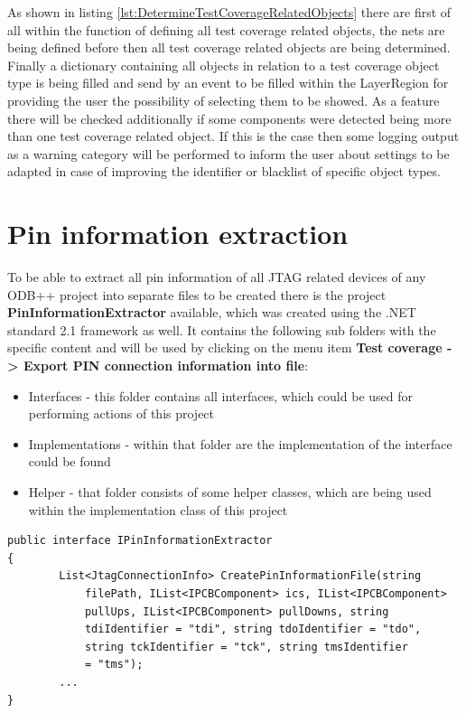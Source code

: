 As shown in listing \ref{lst:DetermineTestCoverageRelatedObjects} there are first of all within the function of defining all test coverage related objects, the nets are being defined before then all test coverage related objects are being determined. Finally a dictionary containing all objects in relation to a test coverage object type is being filled and send by an event to be filled within the LayerRegion for providing the user the possibility of selecting them to be showed. As a feature there will be checked additionally if some components were detected being more than one test coverage related object. If this is the case then some logging output as a warning category will be performed to inform the user about settings to be adapted in case of improving the identifier or blacklist of specific object types.

	\section{Pin information extraction}
To be able to extract all pin information of all \ac{JTAG} related devices of any \ac{ODB}++ project into separate files to be created there is the project \textbf{PinInformationExtractor} available, which was created using the .NET standard 2.1 framework as well. It contains the following sub folders with the specific content and will be used by clicking on the menu item \textbf{Test coverage -> Export PIN connection information into file}:
\begin{itemize}
	\item Interfaces - this folder contains all interfaces, which could be used for performing actions of this project
	\item Implementations - within that folder are the implementation of the interface could be found
	\item Helper - that folder consists of some helper classes, which are being used within the implementation class of this project
\end{itemize}

\begin{lstlisting}[language={[Sharp]C},caption={IPinInformationExtractor},captionpos=b,label=lst:IPinInformationExtractor]
public interface IPinInformationExtractor
{
		List<JtagConnectionInfo> CreatePinInformationFile(string 
			filePath, IList<IPCBComponent> ics, IList<IPCBComponent> 
			pullUps, IList<IPCBComponent> pullDowns, string 
			tdiIdentifier = "tdi", string tdoIdentifier = "tdo",
			string tckIdentifier = "tck", string tmsIdentifier
			= "tms");
		...
}
\end{lstlisting}

